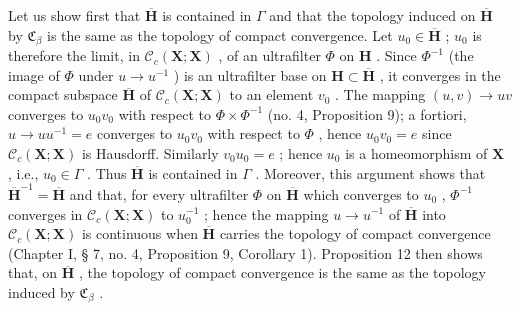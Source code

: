 Let us show first that \(\overline{\mathbf{H}}\) is contained in \(\Gamma\) and that the topology induced on \(\overline{\mathbf{H}}\) by \(\mathfrak{C}_{\beta}\) is the same as the topology of compact convergence. Let \(u_0 \in \overline{\mathbf{H}}\) ; \(u_0\) is therefore the limit, in \(\mathcal{C}_c(\mathbf{X}; \mathbf{X})\) , of an ultrafilter \(\Phi\) on \(\mathbf{H}\) . Since \(\Phi^{-1}\) (the image of \(\Phi\) under \(u \to u^{-1}\) ) is an ultrafilter base on \(\mathbf{H} \subset \overline{\mathbf{H}}\) , it converges in the compact subspace \(\overline{\mathbf{H}}\) of \(\mathcal{C}_c(\mathbf{X}; \mathbf{X})\) to an element \(v_0\) . The mapping \((u, v) \to uv\) converges to \(u_0 v_0\) with respect to \(\Phi \times \Phi^{-1}\) (no. 4, Proposition 9); a fortiori, \(u \to uu^{-1} = e\) converges to \(u_0 v_0\) with respect to \(\Phi\) , hence \(u_0 v_0 = e\) since \(\mathcal{C}_c(\mathbf{X}; \mathbf{X})\) is Hausdorff. Similarly \(v_0 u_0 = e\) ; hence \(u_0\) is a homeomorphism of \(\mathbf{X}\) , i.e., \(u_0 \in \Gamma\) . Thus \(\overline{\mathbf{H}}\) is contained in \(\Gamma\) . Moreover, this argument shows that \(\overline{\mathbf{H}}^{-1} = \overline{\mathbf{H}}\) and that, for every ultrafilter \(\Phi\) on \(\overline{\mathbf{H}}\) which converges to \(u_0\) , \(\Phi^{-1}\) converges in \(\mathcal{C}_c(\mathbf{X}; \mathbf{X})\) to \(u_0^{-1}\) ; hence the mapping \(u \to u^{-1}\) of \(\overline{\mathbf{H}}\) into \(\mathcal{C}_c(\mathbf{X}; \mathbf{X})\) is continuous when \(\overline{\mathbf{H}}\) carries the topology of compact convergence (Chapter I, § 7, no. 4, Proposition 9, Corollary 1). Proposition 12 then shows that, on \(\overline{\mathbf{H}}\) , the topology of compact convergence is the same as the topology induced by \(\mathfrak{C}_{\beta}\) .

